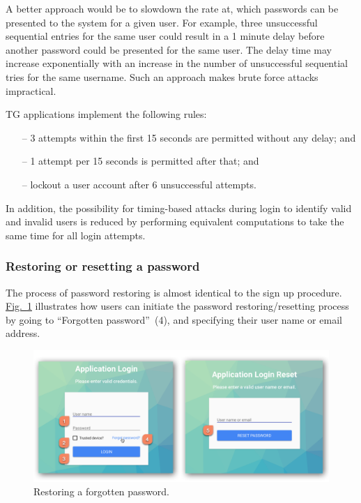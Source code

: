 \documentclass[a4paper,12pt,oneside,openright]{memoir}
\begin{document}
	A better approach would be to slowdown the rate at, which passwords can be presented to the system for a given user.
	For example, three unsuccessful sequential entries for the same user could result in a 1 minute delay before another password could be presented for the same user.
	The delay time may increase exponentially with an increase in the number of unsuccessful sequential tries for the same username.
	Such an approach makes brute force attacks impractical.

	TG applications implement the following rules:
	\begin{itemize}
	\item[--] 3 attempts within the first 15 seconds are permitted without any delay; and
	\item[--] 1 attempt per 15 seconds is permitted after that; and
	\item[--] lockout a user account after 6 unsuccessful attempts.
	\end{itemize}

	In addition, the possibility for timing-based attacks during login to identify valid and invalid users is reduced by performing equivalent computations to take the same time for all login attempts.

\subsubsection*{Restoring or resetting a password}
	The process of password restoring is almost identical to the sign up procedure.
	\hyperref[sec:02:fig:3]{Fig.~\ref*{sec:02:fig:3}} illustrates how users can initiate the password restoring/resetting process by going to ``Forgotten password''~(4), and specifying their user name or email address.

	\begin{figure}[h!tbp]
	\centering
	\includegraphics[width=1\linewidth]{images/04-login-or-forgotten-password.png}
	\caption{Restoring a forgotten password.}\label{sec:02:fig:3}
	\end{figure}
\end{document}
